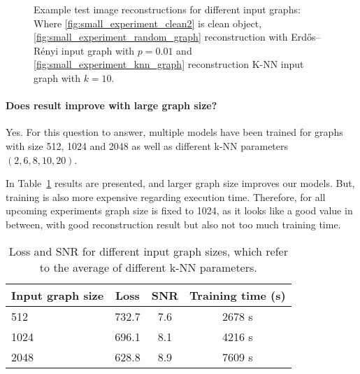   \begin{figure}[H]
    \label{fig:input_graph_small}
    \hfill
    \hfill
    \hfill
    \hfill
	\caption{Example test image reconstructions for different input graphs:\\
  Where \ref{fig:small_experiment_clean2} is clean object, 
  \ref{fig:small_experiment_random_graph} reconstruction with  Erdős–Rényi input graph with $p=0.01$ and 
  \ref{fig:small_experiment_knn_graph} reconstruction K-NN input graph with $k=10$.
  }
\end{figure}


  \paragraph{Does result improve with large graph size?}
  Yes.
  For this question to answer, multiple models have been trained for graphs with size 512, 1024 and 2048 
  as well as different k-NN parameters $(2,6,8,10,20)$.

  In Table~\ref{tab:graph_knn} results are presented, and larger graph size improves our models. 
  But, training is also more expensive regarding execution time. 
  Therefore, for all upcoming experiments graph size is fixed to 1024, as it looks like a good
  value in between, with good reconstruction result but also not too much training time.
  
  \begin{table}[H]
    \centering
      \begin{tabular}{l|ccc}
      \toprule
      \textbf{Input graph size} & \textbf{Loss} & \textbf{SNR} & \textbf{Training time (s)}  \\ 
      \midrule
      512  &  732.7    &  7.6  & 2678 s \\ \hline
      1024 &  696.1    &  8.1  & 4216 s \\ \hline
      2048 &  628.8    &  8.9  & 7609 s  \\ \hline
      \midrule
      \end{tabular}
    \caption{Loss and SNR for different input graph sizes, which refer to the average of different k-NN parameters.}
    \label{tab:graph_knn}
  \end{table}

